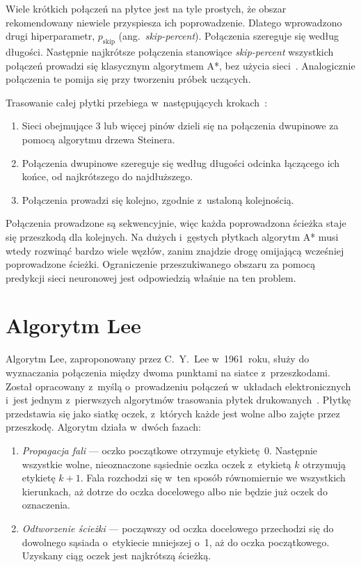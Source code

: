 Wiele krótkich połączeń na płytce jest na tyle prostych, że obszar
rekomendowany niewiele przyspiesza ich poprowadzenie. Dlatego wprowadzono
drugi hiperparametr, $p_{\mathrm{skip}}$ (ang.~\emph{skip-percent}).
Połączenia szereguje się według długości. Następnie najkrótsze połączenia
stanowiące \emph{skip-percent} wszystkich połączeń prowadzi się
klasycznym algorytmem A*, bez użycia sieci~\cite{Yin2023UnetAstar}.
Analogicznie połączenia te pomija się przy tworzeniu próbek
uczących.

Trasowanie całej płytki przebiega w~następujących krokach~\cite{Yin2023UnetAstar}:
\begin{enumerate}
  \item Sieci obejmujące 3 lub więcej pinów dzieli się na połączenia dwupinowe za pomocą
    algorytmu drzewa Steinera.
  \item Połączenia dwupinowe szereguje się według długości odcinka łączącego
    ich końce, od najkrótszego do najdłuższego.
  \item Połączenia prowadzi się kolejno, zgodnie z~ustaloną kolejnością.
\end{enumerate}
Połączenia prowadzone są sekwencyjnie, więc każda poprowadzona ścieżka staje
się przeszkodą dla kolejnych. Na dużych i~gęstych płytkach algorytm A*
musi wtedy rozwinąć bardzo wiele węzłów, zanim znajdzie drogę omijającą
wcześniej poprowadzone ścieżki. Ograniczenie przeszukiwanego obszaru za
pomocą predykcji sieci neuronowej jest odpowiedzią właśnie na ten
problem.

\section{Algorytm Lee}
\label{sec:lee}

Algorytm Lee, zaproponowany przez C.~Y.~Lee w~1961~roku, służy do
wyznaczania połączenia między dwoma punktami na siatce z~przeszkodami.
Został opracowany z~myślą o~prowadzeniu połączeń w~układach
elektronicznych i~jest jednym z~pierwszych algorytmów trasowania płytek
drukowanych~\cite{Lee1961}. Płytkę przedstawia się jako siatkę oczek,
z~których każde jest wolne albo zajęte przez przeszkodę. Algorytm działa
w~dwóch fazach:
\begin{enumerate}
  \item \emph{Propagacja fali} --- oczko początkowe otrzymuje etykietę~0.
    Następnie wszystkie wolne, nieoznaczone sąsiednie oczka oczek
    z~etykietą $k$ otrzymują etykietę $k+1$. Fala rozchodzi się w~ten sposób
    równomiernie we wszystkich kierunkach, aż dotrze do oczka docelowego
    albo nie będzie już oczek do oznaczenia.
  \item \emph{Odtworzenie ścieżki} --- począwszy od oczka docelowego
    przechodzi się do dowolnego sąsiada o~etykiecie mniejszej o~1, aż do
    oczka początkowego. Uzyskany ciąg oczek jest najkrótszą ścieżką.
\end{enumerate}

